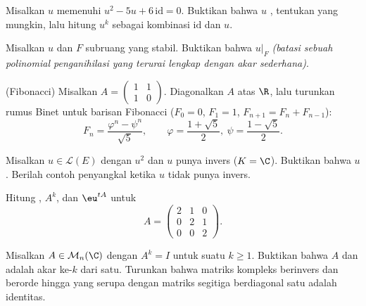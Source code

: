 \begin{exercise}[$\star$]\label{exo:b2:reduction:3}
Misalkan $u$ memenuhi $u^2 - 5u + 6\,\mathrm{id} = 0$. Buktikan bahwa
$u$ , tentukan  yang mungkin, lalu hitung
$u^k$ sebagai kombinasi $\mathrm{id}$ dan $u$.
\end{exercise}

\begin{exercise}[$\star\star$]\label{exo:b2:reduction:4}
Misalkan $u$  dan $F$ subruang yang stabil. Buktikan
bahwa $u|_F$  \emph{(batasi sebuah polinomial
penganihilasi yang terurai lengkap dengan akar sederhana)}.
\end{exercise}

\begin{exercise}[$\star\star$]\label{exo:b2:reduction:5}
(Fibonacci) Misalkan $A = \begin{pmatrix} 1 & 1\\ 1 & 0\end{pmatrix}$.
Diagonalkan $A$ atas $\R$, lalu turunkan rumus Binet untuk
barisan Fibonacci ($F_0 = 0$, $F_1 = 1$, $F_{n+1} = F_n +
F_{n-1}$):
\[
F_n = \frac{\varphi^n - \psi^n}{\sqrt 5},
\qquad \varphi = \frac{1 + \sqrt5}{2},\ \psi = \frac{1 -
\sqrt5}{2}.
\]
\end{exercise}

\begin{exercise}[$\star\star$]\label{exo:b2:reduction:6}
Misalkan $u \in \mathcal{L}(E)$ dengan $u^2$  dan $u$
punya invers ($K = \C$). Buktikan bahwa $u$ . Berilah
contoh penyangkal ketika $u$ tidak punya invers.
\end{exercise}

\begin{exercise}[$\star\star$]\label{exo:b2:reduction:7}
Hitung , $A^k$, dan $\eu^{tA}$ untuk
\[
A = \begin{pmatrix} 2 & 1 & 0\\ 0 & 2 & 1\\ 0 & 0 & 2
\end{pmatrix}.
\]
\end{exercise}

\begin{exercise}[$\star\star$]\label{exo:b2:reduction:8}
Misalkan $A \in \mathcal{M}_n(\C)$ dengan $A^k = I$ untuk suatu $k \geq 1$.
Buktikan bahwa $A$  dan  adalah akar
ke-$k$ dari satu. Turunkan bahwa matriks kompleks berinvers dan berorde
hingga yang serupa dengan matriks segitiga berdiagonal satu adalah identitas.
\end{exercise}

